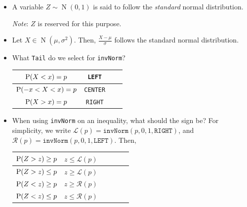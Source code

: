 \documentclass[../Notes.tex]{subfiles}
\begin{document}
\begin{stbox}{}
  \begin{itemize}
    \setcounter{enumi}{3}
    \item A variable \(Z\sim \operatorname{N}(0,1)\) is said to follow the \emph{standard} normal distribution.

    \emph{Note}: \(Z\) is reserved for this purpose.
    \item Let \(X \in \operatorname{N}(\mu,\sigma^2)\). Then, \(\frac{X-\mu}{\sigma}\) follows the standard normal distribution. 
    \item What \texttt{Tail} do we select for \texttt{invNorm}?
    \begin{center}
      \begin{tabular}{|Sc|Sc|}
        \hline
        \(\operatorname{P}(X<x)=p\) & \texttt{LEFT}\\
        \hline
        \(\operatorname{P}(-x<X<x)=p\) & \texttt{CENTER}\\
        \hline
        \(\operatorname{P}(X>x)=p\) & \texttt{RIGHT}\\
        \hline
      \end{tabular}
    \end{center}
    \item When using \texttt{invNorm} on an inequality, what should the sign be? For simplicity, we write \(\mathscr{L}(p)=\texttt{invNorm}(p,0,1,\texttt{RIGHT})\), and \(\mathscr{R}(p)=\texttt{invNorm}(p,0,1,\texttt{LEFT})\). Then,
    \begin{center}
      \begin{tabular}{|Sc|Sc|Sc|}
        \hline
        \(\operatorname{P}(Z>z)\geq p\) & \(z\leq \mathscr{L}(p)\)\\
        \hline
        \(\operatorname{P}(Z>z)\leq p\) & \(z\geq \mathscr{L}(p)\)\\
        \hline
        \(\operatorname{P}(Z<z)\geq p\) & \(z\geq \mathscr{R}(p)\)\\
        \hline
        \(\operatorname{P}(Z<z)\leq p\) & \(z\leq \mathscr{R}(p)\)\\
        \hline
      \end{tabular}
    \end{center}
  \end{itemize}
\end{stbox}
\end{document}
